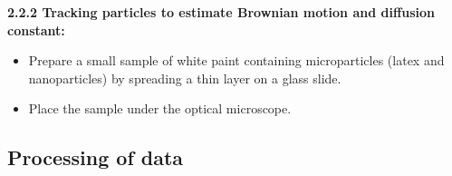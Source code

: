 \textbf{2.2.2 Tracking particles to estimate Brownian motion and diffusion constant:}
\begin{itemize}
    \item Prepare a small sample of white paint containing microparticles (latex and nanoparticles) by spreading a thin layer on a glass slide.
    \item Place the sample under the optical microscope.
\end{itemize}

\subsection{Processing of data}
